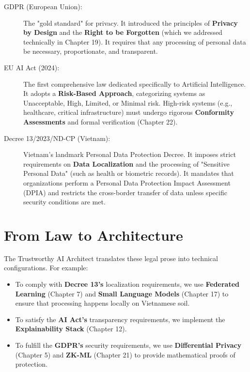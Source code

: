 \begin{description}
  \item[GDPR (European Union):] 
        The "gold standard" for privacy. It introduced the principles of \textbf{Privacy by Design} and the \textbf{Right to be Forgotten} (which we addressed technically in Chapter 19). It requires that any processing of personal data be necessary, proportionate, and transparent.
  \item[EU AI Act (2024):]
        The first comprehensive law dedicated specifically to Artificial Intelligence. It adopts a \textbf{Risk-Based Approach}, categorizing systems as Unacceptable, High, Limited, or Minimal risk. High-risk systems (e.g., healthcare, critical infrastructure) must undergo rigorous \textbf{Conformity Assessments} and formal verification (Chapter 22).
  \item[Decree 13/2023/ND-CP (Vietnam):]
        Vietnam's landmark Personal Data Protection Decree. It imposes strict requirements on \textbf{Data Localization} and the processing of "Sensitive Personal Data" (such as health or biometric records). It mandates that organizations perform a Personal Data Protection Impact Assessment (DPIA) and restricts the cross-border transfer of data unless specific security conditions are met.
\end{description}

\section{From Law to Architecture}
\label{sec:law_to_arch}

The Trustworthy AI Architect translates these legal prose into technical configurations. For example:
\begin{itemize}
    \item To comply with \textbf{Decree 13's} localization requirements, we use \textbf{Federated Learning} (Chapter 7) and \textbf{Small Language Models} (Chapter 17) to ensure that processing happens locally on Vietnamese soil.
    \item To satisfy the \textbf{AI Act's} transparency requirements, we implement the \textbf{Explainability Stack} (Chapter 12).
    \item To fulfill the \textbf{GDPR's} security requirements, we use \textbf{Differential Privacy} (Chapter 5) and \textbf{ZK-ML} (Chapter 21) to provide mathematical proofs of protection.
\end{itemize}

